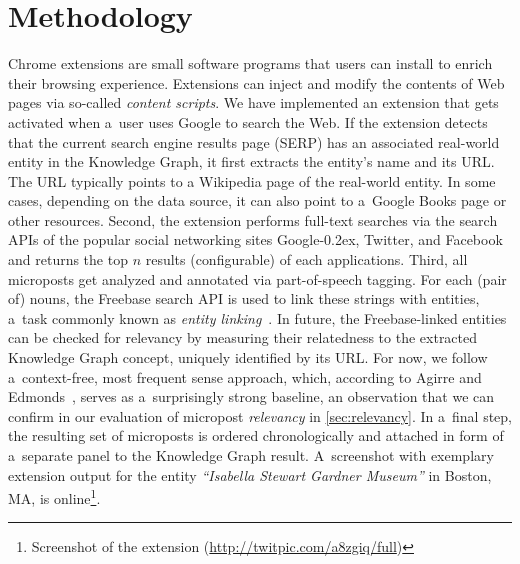 \documentclass[runningheads,a4paper]{llncs}
\newcommand{\googleplus}{Google\nolinebreak\hspace{0em}\raisebox{.28ex}{\tiny\bf +}\kern-0.2ex\xspace}
\begin{document}
\section{Methodology}
Chrome extensions are small software programs that users can install
to enrich their browsing experience. Extensions can inject and modify the contents of Web pages via so-called \emph{content scripts}.
We have implemented an extension that gets activated when a~user uses Google to search the Web.
If the extension detects that the current search engine results page (SERP)
has an associated real-world entity in the Knowledge Graph, it first extracts the entity's name and its URL.
The URL typically points to a Wikipedia page of the real-world entity.
In some cases, depending on the data source,
it can also point to a~Google Books page or other resources.
Second, the extension performs full-text searches via the search APIs of
the popular social networking sites \googleplus, Twitter, and Facebook
and returns the top $n$ results (configurable) of each applications.
Third, all microposts get analyzed and annotated via part-of-speech tagging.
For each (pair of) nouns, the Freebase search API is used
to link these strings with entities,
a~task commonly known as \emph{entity linking}~\cite{spitkovsky2012}.
In future, the Freebase-linked entities can be checked for relevancy
by measuring their relatedness to the extracted Knowledge Graph concept,
uniquely identified by its URL.
For now, we follow a~context-free, most frequent sense approach,
which, according to Agirre and Edmonds~\cite{agirre2007},
serves as a~surprisingly strong baseline,
an observation that we can confirm in our evaluation of micropost \emph{relevancy}
in \autoref{sec:relevancy}.
In a~final step, the resulting set of microposts is ordered chronologically
and attached in form of a~separate panel to the Knowledge Graph result.
A~screenshot with exemplary extension output for the entity
\emph{``Isabella Stewart Gardner Museum''} in Boston, MA,
is online\footnote{Screenshot of the extension (\url{http://twitpic.com/a8zgiq/full})}.

\end{document}
